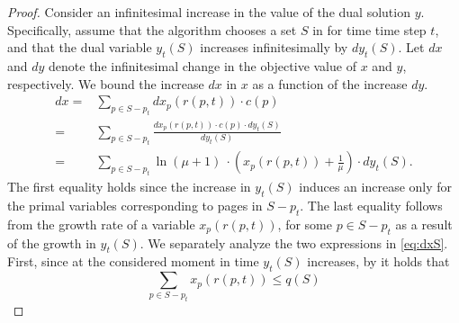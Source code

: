 \begin{proof}
	Consider an infinitesimal increase in the value of the dual solution $y$. Specifically, assume that the algorithm chooses a set $S$ in  for time time step $t$, and that the dual variable $y_t(S)$ increases infinitesimally by $d y_t(S)$. Let $dx$ and $dy$ denote the infinitesimal change in the objective value of $x$ and $y$, respectively. We bound the increase $dx$ in $x$ as a function of the increase $dy$.   
	\begin{equation}
		\label{eq:dxS}
		\begin{aligned}
			dx ={} & \sum_{p \in S-p_t} d x_p(r(p,t)) \cdot c(p) \\
			={} & \sum_{p \in S-p_t}  \frac{d x_p(r(p,t)) \cdot c(p) \cdot d y_t(S)}{d y_t(S)} \\
			={} & \sum_{p \in S-p_t} \ln \left(\mu+1 \right)\ \cdot \left( x_p(r(p,t))+\frac{1}{\mu} \right) \cdot d y_t(S). 
		\end{aligned}
	\end{equation} The first equality holds since the increase in $y_t(S)$ induces an increase only for the primal variables corresponding to pages in $S-p_t$. The last equality follows from the growth rate of a variable $x_p(r(p,t))$, for some $p \in S-p_t$ as a result of the growth in $y_t(S)$. %
	We separately analyze the two expressions in \eqref{eq:dxS}. First, since at the considered moment in time $y_t(S)$ increases, by  it holds that 
	\begin{equation}
		\label{eq:InwhileFS}
		\sum_{p \in S-p_t} x_p(r(p,t)) \leq q(S)%
	\end{equation} 
	

\end{proof}
